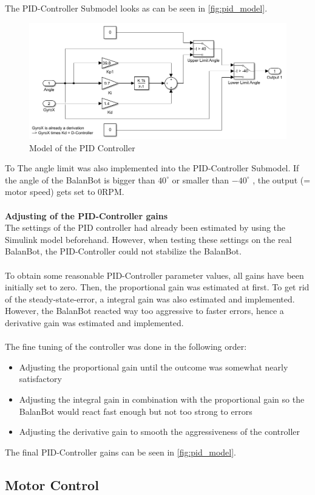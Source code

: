 The PID-Controller Submodel looks as can be seen in \autoref{fig:pid_model}.
\begin{figure}[H]
    \centering
    \includegraphics[width=\textwidth]{Lab_report/pics/hardware_impl/PID.PNG}
    \caption{Model of the PID Controller}
    \label{fig:pid_model}
\end{figure}
To 
The angle limit was also implemented into the PID-Controller Submodel. If the angle of the BalanBot is bigger than $40^\circ$ or smaller than $-40^\circ$ , the output (= motor speed) gets set to 0RPM.
\newline\\\\
\textbf{Adjusting of the PID-Controller gains}\\
The settings of the PID controller had already been estimated by using the Simulink model beforehand. However, when testing these settings on the real BalanBot, the PID-Controller could not stabilize the BalanBot.\\\\
To obtain some reasonable PID-Controller parameter values, all gains have been initially set to zero. Then, the proportional gain was estimated at first. To get rid of the steady-state-error, a integral gain was also estimated and implemented. However, the BalanBot reacted way too aggressive to faster errors, hence a derivative gain was estimated and implemented.\\\\
The fine tuning of the controller was done in the following order:
\begin{itemize}
    \item Adjusting the proportional gain until the outcome was somewhat nearly satisfactory
    \item Adjusting the integral gain in combination with the proportional gain so the BalanBot would react fast enough but not too strong to errors
    \item Adjusting the derivative gain to smooth the aggressiveness of the controller
\end{itemize}

The final PID-Controller gains can be seen in \autoref{fig:pid_model}.
\subsection{Motor Control}

